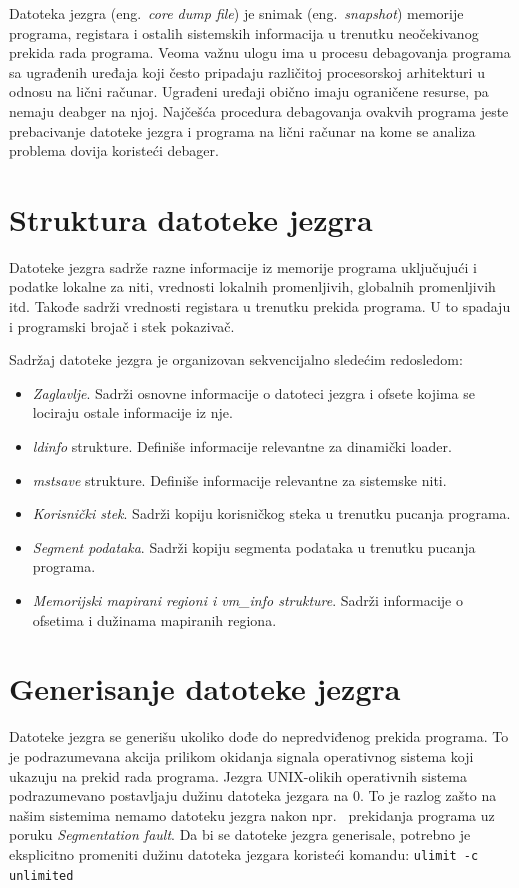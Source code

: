 \documentclass[12pt,oneside]{memoir}
\begin{document}
Datoteka jezgra (eng.~\emph{core dump file}) je snimak (eng.~\emph{snapshot}) memorije programa, registara i ostalih sistemskih informacija u trenutku neočekivanog prekida rada programa. Veoma važnu ulogu ima u procesu debagovanja programa sa ugrađenih uređaja koji često pripadaju različitoj procesorskoj arhitekturi u odnosu na lični računar. Ugrađeni uređaji obično imaju ograničene resurse, pa nemaju deabger na njoj. Najčešća procedura debagovanja ovakvih programa jeste prebacivanje datoteke jezgra i programa na lični računar na kome se analiza problema dovija koristeći debager.

\section{Struktura datoteke jezgra}

Datoteke jezgra sadrže razne informacije iz memorije programa uključujući i podatke lokalne za niti, vrednosti lokalnih promenljivih, globalnih promenljivih itd. Takođe sadrži vrednosti registara u trenutku prekida programa. U to spadaju i programski brojač i stek pokazivač.

Sadržaj datoteke jezgra je organizovan sekvencijalno sledećim redosledom:

\begin{itemize}
	\item \emph{Zaglavlje}. Sadrži osnovne informacije o datoteci jezgra i ofsete kojima se lociraju ostale informacije iz nje.
	\item \emph{ldinfo} strukture. Definiše informacije relevantne za dinamički loader.
	\item \emph{mstsave} strukture. Definiše informacije relevantne za sistemske niti.
	\item \emph{Korisnički stek}. Sadrži kopiju korisničkog steka u trenutku pucanja programa.
	\item \emph{Segment podataka}. Sadrži kopiju segmenta podataka u trenutku pucanja programa.
	\item \emph{Memorijski mapirani regioni i vm\_info strukture}. Sadrži informacije o ofsetima i dužinama mapiranih regiona.
\end{itemize}

\section{Generisanje datoteke jezgra}

Datoteke jezgra se generišu ukoliko dođe do nepredviđenog prekida programa. To je podrazumevana akcija prilikom okidanja signala operativnog sistema koji ukazuju na prekid rada programa. Jezgra UNIX-olikih operativnih sistema podrazumevano postavljaju dužinu datoteka jezgara na 0. To je razlog zašto na našim sistemima nemamo datoteku jezgra nakon npr.~ prekidanja programa uz poruku \emph{Segmentation fault}. Da bi se datoteke jezgra generisale, potrebno je eksplicitno promeniti dužinu datoteka jezgara koristeći komandu:
\newline
\texttt{ulimit -c unlimited}
\end{document}
